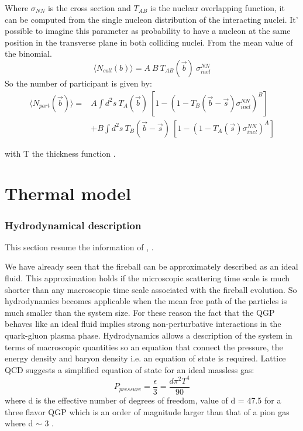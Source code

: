 \documentclass[12pt,a4paper]{book}
\begin{document}
	Where $\sigma_{NN}$ is the cross section and $T_{AB}$ is the nuclear overlapping function, it can be computed from the single nucleon distribution of the interacting nuclei. It' possible to imagine this parameter as probability to have a nucleon at the same position in the transverse plane in both colliding nuclei. From the mean value of the binomial.
	\begin{equation}
		\langle N_{coll}(b) \rangle = A\ B \ T_{AB}(\vec{b}) \ \sigma_{inel}^{NN}
		\label{eq:num_collisione}
	\end{equation}
	So the number of participant is given by:
	\begin{equation}
		\begin{aligned}
			\langle N_{part}(\vec{b}) \rangle = & A \int d^2 s \ T_{A}(\vec{b}) \ \left[1-\left( 1 - T_{B}(\vec{b}-\vec{s}) \sigma_{inel}^{NN} \right)^B \right] \\
			& + B \int d^2 s \ T_{B}(\vec{b}-\vec{s}) \ \left[1-\left( 1 - T_{A}(\vec{s}) \sigma_{inel}^{NN} \right)^A \right]
		\end{aligned}
		\label{eq:num_partecipant}
	\end{equation}
	
	with T the  thickness function \cite{Arata:2922803}.
	
	\chapter{Thermal model}
	\subsection{Hydrodynamical description}
	This section resume the information of \cite{heinz2004conceptsheavyionphysics}, \cite{phdthesis}.
	
	We have already seen that the fireball can be approximately described as an ideal fluid. This approximation holds if the microscopic scattering time scale is much shorter than any macroscopic time scale associated with the fireball evolution. So hydrodynamics becomes applicable when the mean free path of the particles is much smaller than the system size. For these reason the fact that the QGP behaves like an ideal fluid implies strong non-perturbative interactions in the quark-gluon plasma phase. Hydrodynamics allows a description of the system in terms of macroscopic quantities so an equation that connect the pressure, the energy density and baryon density i.e. an equation of state is required. Lattice QCD suggests a simplified equation of state for an ideal massless gas:
	\begin{equation}
		P_{pressure}=\frac{\epsilon}{3}=\frac{d \pi^2 T^4}{90}
		\label{eq:EoS}
	\end{equation}
	where d is the effective number of degrees of freedom, value of d = 47.5 for a three flavor QGP which is an order of magnitude larger than that of a pion gas where d $\sim$ 3 \cite{Snellings_2011}.
	
\end{document}
